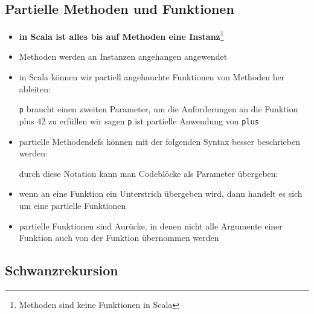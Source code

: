 \subsection{Partielle Methoden und Funktionen}
\begin{itemize}
  \item \textbf{in Scala ist alles bis auf Methoden eine 
  Instanz}\footnote{Methoden sind keine Funktionen in Scala}
  \item Methoden werden an Instanzen angehangen \und angewendet
  \item in Scala können wir partiell angehauchte Funktionen von Methoden
  her ableiten:
  
  
  
  \texttt{p} braucht einen zweiten Parameter, um die Anforderungen an
  die Funktion plus 42 zu erfüllen \und wir sagen \texttt{p} ist
  partielle Anwendung von \texttt{plus}
  
  \item partielle Methodendefs können mit der folgenden Syntax besser
  beschrieben werden:
  
  
  
  
  durch diese Notation kann man Codeblöcke als Parameter übergeben:
  
  
  
    \item wenn an eine Funktion ein Unterstrich übergeben wird, dann handelt
  es sich um eine partielle Funktionen
  \item partielle Funktionen sind Aurücke, in denen nicht alle Argumente 
  einer Funktion auch von der Funktion übernommen werden
  
    

\end{itemize}


\subsection{Schwanzrekursion}






